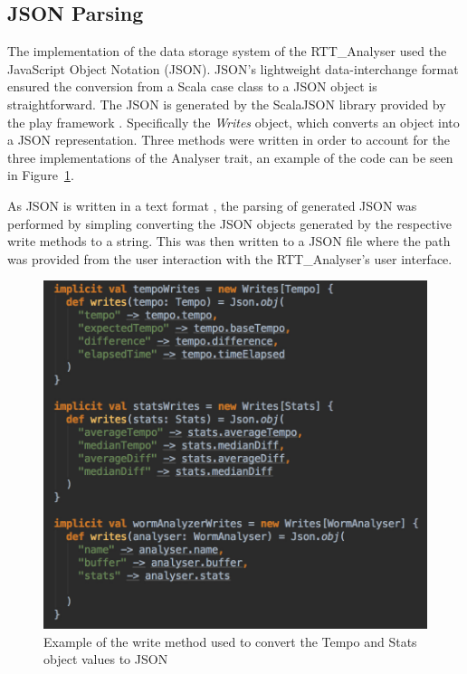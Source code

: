 \documentclass[a4paper, 11pt]{article}
\begin{document}
\subsection{JSON Parsing}

The implementation of the data storage system of the RTT\_Analyser used the JavaScript Object Notation (JSON). JSON's lightweight data-interchange format \cite{json} ensured the conversion from a Scala case class to a JSON object is straightforward. The JSON is generated by the ScalaJSON library provided by the play framework \cite{play}. Specifically the \textit{Writes} object, which converts an object into a JSON representation. Three methods were written in order to account for the three implementations of the Analyser trait, an example of the code can be seen in Figure~\ref{fig: json}.\par

As JSON is written in a text format \cite{json}, the parsing of generated JSON was performed by simpling converting the JSON objects generated by the respective write methods to a string. This was then written to a JSON file where the path was provided from the user interaction with the RTT\_Analyser's user interface.

\begin{figure}[htbp]
\centering
\includegraphics[scale=0.25]{images/writes.jpg}
\caption{Example of the write method used to convert the Tempo and Stats object values to JSON}
\label{fig: json}
\end{figure}
\end{document}
